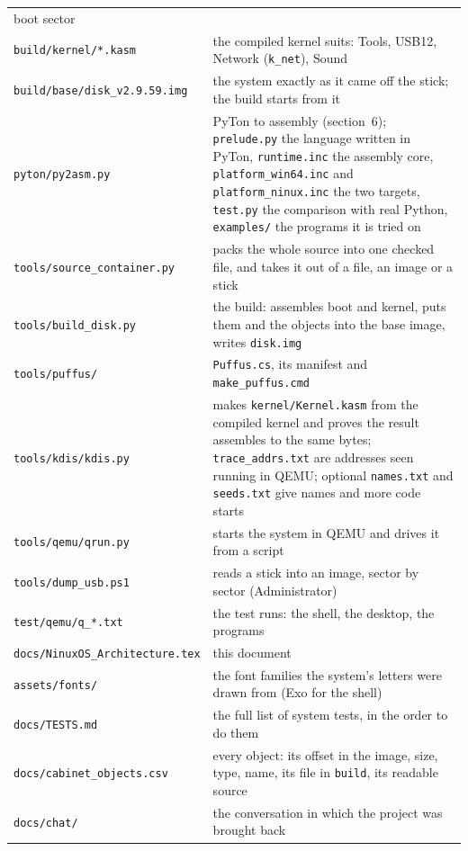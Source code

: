 \documentclass[11pt,a4paper]{article}
\newcommand{\file}[1]{\texttt{#1}}
\begin{document}
\begin{longtable}{@{}p{4.6cm} p{10.4cm}@{}}
      boot sector \\
\file{build/kernel/*.kasm} & the compiled kernel suits: Tools, USB12, Network (\texttt{k\_net}),
      Sound \\
\file{build/base/disk\_v2.9.59.img} & the system exactly as it came off the stick; the build
      starts from it \\
\midrule
\file{pyton/py2asm.py} & PyTon to assembly (section~6); \file{prelude.py} the language written in
      PyTon, \file{runtime.inc} the assembly core, \file{platform\_win64.inc} and
      \file{platform\_ninux.inc} the two targets, \file{test.py} the comparison with real Python,
      \file{examples/} the programs it is tried on \\
\file{tools/source\_container.py} & packs the whole source into one checked file, and takes it out
      of a file, an image or a stick \\
\file{tools/build\_disk.py} & the build: assembles boot and kernel, puts them and the objects
      into the base image, writes \file{disk.img} \\
\file{tools/puffus/} & \file{Puffus.cs}, its manifest and \file{make\_puffus.cmd} \\
\file{tools/kdis/kdis.py} & makes \file{kernel/Kernel.kasm} from the compiled kernel and proves
      the result assembles to the same bytes; \file{trace\_addrs.txt} are addresses seen running
      in QEMU; optional \file{names.txt} and \file{seeds.txt} give names and more code starts \\
\file{tools/qemu/qrun.py} & starts the system in QEMU and drives it from a script \\
\file{tools/dump\_usb.ps1} & reads a stick into an image, sector by sector (Administrator) \\
\file{test/qemu/q\_*.txt} & the test runs: the shell, the desktop, the programs \\
\midrule
\file{docs/NinuxOS\_Architecture.tex} & this document \\
\file{assets/fonts/} & the font families the system's letters were drawn from (Exo for the shell) \\
\file{docs/TESTS.md} & the full list of system tests, in the order to do them \\
\file{docs/cabinet\_objects.csv} & every object: its offset in the image, size, type, name, its
      file in \file{build}, its readable source \\
\file{docs/chat/} & the conversation in which the project was brought back \\
\bottomrule
\end{longtable}
\end{document}
